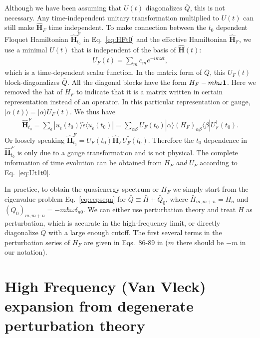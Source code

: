 \documentclass[aps,prb,showpacs,amsmath,amssymb,superscriptaddress]{revtex4-2}
\let\oldhat\hat
\renewcommand{\hat}[1]{\oldhat{\mathbf{#1}}}
\begin{document}
Although we have been assuming that $U(t)$ diagonalizes $\bar{Q}$, this is not necessary. Any time-independent unitary transformation multiplied to $U(t)$ can still make $\hat{H}_F$ time independent. To make connection between the $t_0$ dependent Floquet Hamiltonian $\hat{H}^F_{t_0}$ in Eq.~\ref{eq:HFt0} and the effective Hamiltonian $\hat{H}_F$, we use a minimal $U(t)$ that is independent of the basis of $\hat{H}(t)$:
\begin{eqnarray}
	U_F(t) =\sum_m c_m e^{-im\omega t},
\end{eqnarray}
which is a time-dependent scalar function. In the matrix form of $\bar{Q}$, this $U_F(t)$ block-diagonalizes $\bar{Q}$. All the diagonal blocks have the form $H_F - m\hbar \omega \bf{1}$. Here we removed the hat of $H_F$ to indicate that it is a matrix written in certain representation instead of an operator. In this particular representation or gauge, $|\alpha(t)\rangle = |\alpha\rangle U_F(t)$. We thus have
\begin{eqnarray}
	\hat{H}_{t_0}^F = \sum_{\tilde{\epsilon}}|u_{\tilde{\epsilon}}(t_0)\rangle \tilde{\epsilon} \langle u_{\tilde{\epsilon}} (t_0)| = \sum_{\alpha\beta} U_F(t_0) |\alpha\rangle (H_F)_{\alpha\beta} \langle \beta | U_F^\dag(t_0).
\end{eqnarray}
Or loosely speaking $\hat{H}_{t_0}^F =  U_F(t_0) \hat{H}_F U_F^\dag(t_0)$. Therefore the $t_0$ dependence in $\hat{H}_{t_0}^F$ is only due to a gauge transformation and is not physical. The complete information of time evolution can be obtained from $H_F$ \emph{and} $U_F$ according to Eq.~\ref{eq:Ut1t0}.

In practice, to obtain the quasienergy spectrum or $H_F$ we simply start from the eigenvalue problem Eq.~\ref{eq:cepseqn} for $\bar{Q}\equiv \bar{H} + \bar{Q}_0$, where $\bar{H}_{m,m+n} = H_n$ and $(\bar{Q}_0)_{m,m+n} = -m\hbar \omega \delta_{n0}$. We can either use perturbation theory and treat $\bar{H}$ as perturbation, which is accurate in the high-frequency limit, or directly diagonalize $\bar{Q}$ with a large enough cutoff. The first several terms in the perturbation series of $H_F$ are given in Eqs.~86-89 in \cite{AEE} ($m$ there should be $-m$ in our notation).

\section{High Frequency (Van Vleck) expansion from degenerate perturbation theory}
\end{document}
